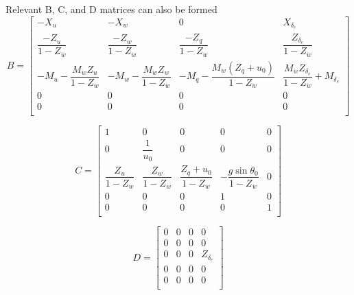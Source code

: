 \documentclass[12pt]{article}
\begin{document}
\noindent Relevant B, C, and D matrices can also be formed
\begin{equation*}
B =
\begin{bmatrix}
-X_u                                          & -X_w                                          & 0                                               & X_{\delta_e} \\
\dfrac{-Z_u}{1-Z_{\dot{w}}}                   & \dfrac{-Z_w}{1-Z_{\dot{w}}}                   & \dfrac{-Z_q}{1-Z_{\dot{w}}}                     & \dfrac{Z_{\delta_e}}{1-Z_{\dot{w}}} \\
-M_u - \dfrac{M_{\dot{w}} Z_u}{1-Z_{\dot{w}}} & -M_w - \dfrac{M_{\dot{w}} Z_w}{1-Z_{\dot{w}}} & -M_q -\dfrac{M_{\dot{w}} (Z_q + u_0)}{1-Z_{\dot{w}}} & \dfrac{M_{\dot{w}} Z_{\delta_e}}{1-Z_{\dot{w}}} + M_{\delta_e} \\


    0   &  0   &  0   & 0 \\
    0   &  0   &  0   & 0 \\
\end{bmatrix}
\end{equation*}

\begin{equation*}
C =
\begin{bmatrix}
    1 & 0     & 0 & 0 & 0\\
    0 & \dfrac{1}{u_0} & 0 & 0 & 0\\
    \dfrac{Z_u}{1-Z_{\dot{w}}} & \dfrac{Z_w}{1-Z_{\dot{w}}} & \dfrac{Z_q + u_0}{1-Z_{\dot{w}}} & -\dfrac{g\sin \theta_0}{1-Z_{\dot{w}}} & 0 \\
    0 & 0     & 0 & 1 & 0\\
    0 & 0     & 0 & 0 & 1\\
\end{bmatrix}
\end{equation*}

\begin{equation*}
D =
\begin{bmatrix}
    0 & 0 & 0 & 0    \\
    0 & 0 & 0 & 0    \\
    0 & 0 & 0 & Z_{\delta_e} \\
    0 & 0 & 0 & 0     \\
    0 & 0 & 0 & 0     \\
\end{bmatrix}
\end{equation*}
\end{document}
